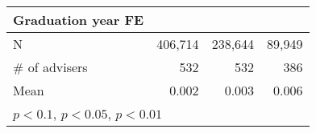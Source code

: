 {\begin{tabular}{l*{3}{D{.}{.}{-1}}}
\addlinespace
Graduation year FE            	&     \checkmark         	&     \checkmark         	&     \checkmark         \\
\midrule
N                             	&        406,714         	&        238,644         	&         89,949         \\
\# of advisers                	&            532         	&            532         	&            386         \\
Mean                          	&          0.002         	&          0.003         	&          0.006         \\
\bottomrule
{}\\
\end{tabular}
}
